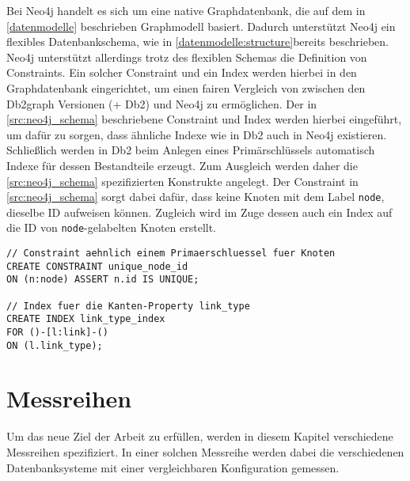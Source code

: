 Bei Neo4j handelt es sich um eine native Graphdatenbank, die auf dem in \autoref{datenmodelle} beschrieben Graphmodell basiert. Dadurch unterstützt Neo4j ein flexibles Datenbankschema, wie in \autoref{datenmodelle:structure}bereits beschrieben. Neo4j unterstützt allerdings trotz des flexiblen Schemas die Definition von Constraints. Ein solcher Constraint und ein Index werden hierbei in den Graphdatenbank eingerichtet, um einen fairen Vergleich von zwischen den Db2graph Versionen (+ Db2) und Neo4j zu ermöglichen. Der in \autoref{src:neo4j_schema} beschriebene Constraint und Index werden hierbei eingeführt, um dafür zu sorgen, dass ähnliche Indexe wie in Db2 auch in Neo4j existieren. Schließlich werden in Db2 beim Anlegen eines Primärschlüssels automatisch Indexe für dessen Bestandteile erzeugt. Zum Ausgleich werden daher die \autoref{src:neo4j_schema} spezifizierten Konstrukte angelegt. Der Constraint in \autoref{src:neo4j_schema} sorgt dabei dafür, dass keine Knoten mit dem Label \texttt{node}, dieselbe ID aufweisen können. Zugleich wird im Zuge dessen auch ein Index auf die ID von \texttt{node}-gelabelten Knoten erstellt.

\begin{lstlisting}[label=src:neo4j_schema,caption={Neo4j Instanz Datenbankschema},language=CQL]
// Constraint aehnlich einem Primaerschluessel fuer Knoten
CREATE CONSTRAINT unique_node_id 
ON (n:node) ASSERT n.id IS UNIQUE;

// Index fuer die Kanten-Property link_type
CREATE INDEX link_type_index 
FOR ()-[l:link]-() 
ON (l.link_type);
\end{lstlisting}

\section{Messreihen}
\label{analyse:messreihen}
Um das neue Ziel der Arbeit zu erfüllen, werden in diesem Kapitel verschiedene Messreihen spezifiziert. In einer solchen Messreihe werden dabei die verschiedenen Datenbanksysteme mit einer vergleichbaren Konfiguration gemessen.

